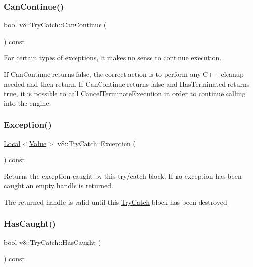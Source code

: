 \subsubsection{\texorpdfstring{Can\+Continue()}{CanContinue()}}
{\footnotesize\ttfamily bool v8\+::\+Try\+Catch\+::\+Can\+Continue (\begin{DoxyParamCaption}{ }\end{DoxyParamCaption}) const}

For certain types of exceptions, it makes no sense to continue execution.

If Can\+Continue returns false, the correct action is to perform any C++ cleanup needed and then return. If Can\+Continue returns false and Has\+Terminated returns true, it is possible to call Cancel\+Terminate\+Execution in order to continue calling into the engine. \mbox{\label{classv8_1_1TryCatch_acad32566761cace7762e023c9e443323}} 
\subsubsection{\texorpdfstring{Exception()}{Exception()}}
{\footnotesize\ttfamily \mbox{\hyperlink{classv8_1_1Local}{Local}}$<$\mbox{\hyperlink{classv8_1_1Value}{Value}}$>$ v8\+::\+Try\+Catch\+::\+Exception (\begin{DoxyParamCaption}{ }\end{DoxyParamCaption}) const}

Returns the exception caught by this try/catch block. If no exception has been caught an empty handle is returned.

The returned handle is valid until this \mbox{\hyperlink{classv8_1_1TryCatch}{Try\+Catch}} block has been destroyed. \mbox{\label{classv8_1_1TryCatch_ab77b36a4adf5681da59abfe43adc4e4e}} 
\subsubsection{\texorpdfstring{Has\+Caught()}{HasCaught()}}
{\footnotesize\ttfamily bool v8\+::\+Try\+Catch\+::\+Has\+Caught (\begin{DoxyParamCaption}{ }\end{DoxyParamCaption}) const}

